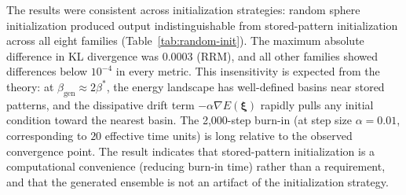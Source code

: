 The results were consistent across initialization strategies: random sphere initialization produced output indistinguishable from stored-pattern initialization across all eight families (Table~\ref{tab:random-init}). The maximum absolute difference in KL divergence was $0.0003$ (RRM), and all other families showed differences below $10^{-4}$ in every metric. This insensitivity is expected from the theory: at $\beta_{\mathrm{gen}} \approx 2\beta^*$, the energy landscape has well-defined basins near stored patterns, and the dissipative drift term $-\alpha\nabla E(\boldsymbol{\xi})$ rapidly pulls any initial condition toward the nearest basin. The 2{,}000-step burn-in (at step size $\alpha{=}0.01$, corresponding to $20$ effective time units) is long relative to the observed convergence point. The result indicates that stored-pattern initialization is a computational convenience (reducing burn-in time) rather than a requirement, and that the generated ensemble is not an artifact of the initialization strategy.

